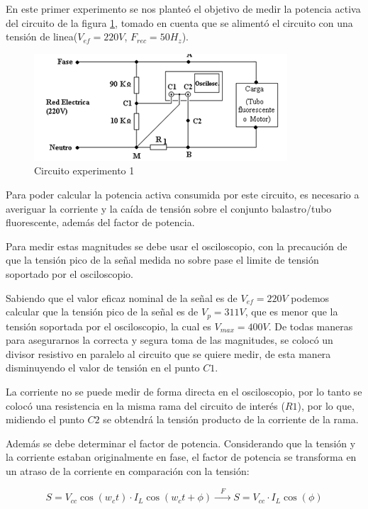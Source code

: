 En este primer experimento se nos planteó el objetivo de medir la potencia activa del circuito de la figura \ref{fig:exp1med}, tomado en cuenta que se alimentó el circuito con una tensión de linea($V_{ef}=220V$, $F_{rec}=50H_z$).

\begin{figure}[H]
    \centering
    \includegraphics[width=0.7\linewidth]{Imagenes/exp1med.png}
    \caption{Circuito experimento 1}
    \label{fig:exp1med}
\end{figure}

Para poder calcular la potencia activa consumida por este circuito, es necesario a averiguar la corriente y la caída de tensión sobre el conjunto balastro/tubo fluorescente, además del factor de potencia.

Para medir estas magnitudes se debe usar el osciloscopio, con la precaución de que la tensión pico de la señal medida no sobre pase el limite de tensión soportado por el osciloscopio. 

Sabiendo que el valor eficaz nominal de la señal es de $V_{ef}=220V$ podemos calcular que la tensión pico de la señal es de $V_{p}=311V$, que es menor que la tensión soportada por el osciloscopio, la cual es $V_{max}=400V$. De todas maneras para asegurarnos la correcta y segura toma de las magnitudes, se colocó un divisor resistivo en paralelo al circuito que se quiere medir, de esta manera disminuyendo el valor de tensión en el punto $C1$. 

La corriente no se puede medir de forma directa en el osciloscopio, por lo tanto se colocó una resistencia en la misma rama del circuito de interés ($R1$), por lo que, midiendo el punto $C2$ se obtendrá la tensión producto de la corriente de la rama.

Además se debe determinar el factor de potencia. Considerando que la tensión y la corriente estaban originalmente en fase, el factor de potencia se transforma en un atraso de la corriente en comparación con la tensión:

\begin{equation}
    S=V_{cc}\cos{(w_ct)}\cdot I_{L} \cos{(w_ct+\phi)} \xrightarrow{\hspace{10pt}F\hspace{10pt}} S=V_{cc}\cdot I_{L} \cos{(\phi)}
\end{equation}


